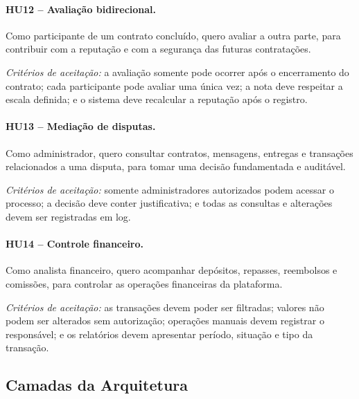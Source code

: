 \documentclass[portuguese]{sbcreviews-2025}
\begin{document}
\paragraph{HU12 -- Avaliação bidirecional.}

Como participante de um contrato concluído, quero avaliar a outra
parte, para contribuir com a reputação e com a segurança das futuras
contratações.

\textit{Critérios de aceitação:} a avaliação somente pode ocorrer
após o encerramento do contrato; cada participante pode avaliar uma
única vez; a nota deve respeitar a escala definida; e o sistema deve
recalcular a reputação após o registro.

\paragraph{HU13 -- Mediação de disputas.}

Como administrador, quero consultar contratos, mensagens, entregas
e transações relacionados a uma disputa, para tomar uma decisão
fundamentada e auditável.

\textit{Critérios de aceitação:} somente administradores autorizados
podem acessar o processo; a decisão deve conter justificativa; e
todas as consultas e alterações devem ser registradas em log.

\paragraph{HU14 -- Controle financeiro.}

Como analista financeiro, quero acompanhar depósitos, repasses,
reembolsos e comissões, para controlar as operações financeiras da
plataforma.

\textit{Critérios de aceitação:} as transações devem poder ser
filtradas; valores não podem ser alterados sem autorização;
operações manuais devem registrar o responsável; e os relatórios
devem apresentar período, situação e tipo da transação.

\clearpage
\subsection{Camadas da Arquitetura}
\label{ap:camadas}
\end{document}
